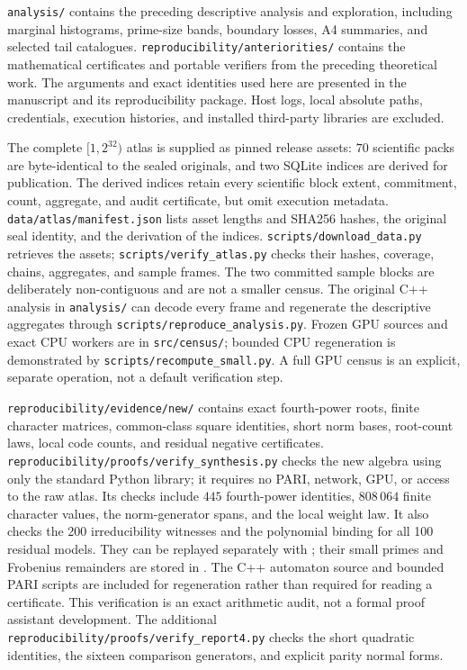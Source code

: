 \documentclass[11pt]{article}
\theoremstyle{definition}\newtheorem{definition}[theorem]{Definition}
\begin{document}
\texttt{analysis/} contains the preceding descriptive analysis
and exploration, including marginal histograms, prime-size bands,
boundary losses, A4 summaries, and selected tail catalogues.
\texttt{reproducibility/anteriorities/} contains the mathematical
certificates and portable verifiers from the preceding theoretical
work. The arguments and exact identities used here are presented in
the manuscript and its reproducibility package. Host logs, local
absolute paths, credentials, execution histories, and installed
third-party libraries are excluded.

The complete $[1,2^{32})$ atlas is supplied as pinned release assets:
$70$ scientific packs are byte-identical to the sealed originals,
and two SQLite indices are derived for publication. The derived
indices retain every scientific block extent, commitment, count,
aggregate, and audit certificate, but omit execution metadata.
\texttt{data/atlas/manifest.json} lists asset lengths and SHA256
hashes, the original seal identity, and the derivation of the
indices. \texttt{scripts/download\_data.py} retrieves the assets;
\texttt{scripts/verify\_atlas.py} checks their hashes, coverage,
chains, aggregates, and sample frames. The two committed sample
blocks are deliberately non-contiguous and are not a smaller census.
The original C++ analysis in \texttt{analysis/} can decode every
frame and regenerate the descriptive aggregates through
\texttt{scripts/reproduce\_analysis.py}. Frozen GPU sources and
exact CPU workers are in \texttt{src/census/}; bounded CPU
regeneration is demonstrated by \texttt{scripts/recompute\_small.py}.
A full GPU census is an explicit, separate operation, not a default
verification step.

\texttt{reproducibility/evidence/new/} contains exact fourth-power
roots, finite character matrices, common-class square identities,
short norm bases, root-count laws, local code counts, and residual
negative certificates. \texttt{reproducibility/proofs/verify\_synthesis.py}
checks the new algebra using only the standard Python library;
it requires no PARI, network, GPU, or access to the raw atlas.
Its checks include $445$ fourth-power identities, $808\,064$ finite
character values, the norm-generator spans, and the local weight law.
It also checks the 200 irreducibility witnesses and the polynomial
binding for all 100 residual models. They can be replayed separately
with ; their
small primes and Frobenius remainders are stored in
.
The C++ automaton source and bounded PARI scripts are included for
regeneration rather than required for reading a certificate.
This verification is an exact arithmetic audit, not a formal
proof assistant development. The additional
\texttt{reproducibility/proofs/verify\_report4.py} checks the short
quadratic identities, the sixteen comparison generators, and
explicit parity normal forms.
\end{document}
